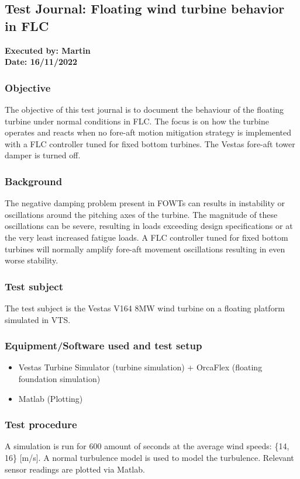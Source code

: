 \subsection{Test Journal: Floating wind turbine behavior in FLC} \label{app:tj_02}

\textbf{Executed by: Martin} \\
\textbf{Date: 16/11/2022}

\subsubsection*{Objective}
The objective of this test journal is to document the behaviour of the floating turbine under normal conditions in FLC. The focus is on how the turbine operates and reacts when no fore-aft motion mitigation strategy is implemented with a FLC controller tuned for fixed bottom turbines. The Vestas fore-aft tower damper is turned off.

\subsubsection*{Background}
The negative damping problem present in FOWTs can results in instability or oscillations around the pitching axes of the turbine. The magnitude of these oscillations can be severe, resulting in loads exceeding design specifications or at the very least increased fatigue loads. A FLC controller tuned for fixed bottom turbines will normally amplify fore-aft movement oscillations resulting in even worse stability.

\subsubsection*{Test subject}
The test subject is the Vestas V164 8MW wind turbine on a floating platform simulated in VTS.

\subsubsection*{Equipment/Software used and test setup}
\begin{itemize}
	\item Vestas Turbine Simulator (turbine simulation) + OrcaFlex (floating foundation simulation)
	\item Matlab (Plotting)
\end{itemize}

\subsubsection*{Test procedure}
A simulation is run for 600 amount of seconds at the average wind speeds: \{14, 16\} [m/s]. A normal turbulence model is used to model the turbulence. Relevant sensor readings are plotted via Matlab.

